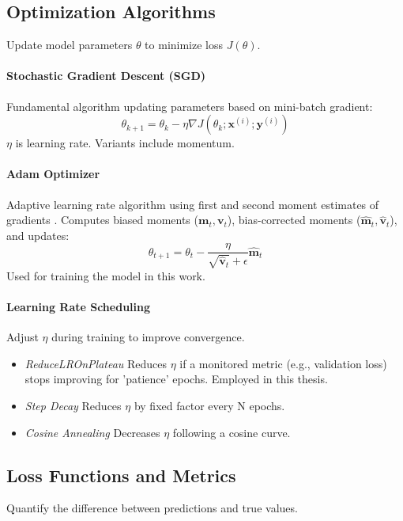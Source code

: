 \begin{appendices}
  \subsection{Optimization Algorithms}
  \label{subsec:optimization_app}
  Update model parameters $ \theta $ to minimize loss $ J(\theta) $.

  \paragraph{Stochastic Gradient Descent (SGD)}
  Fundamental algorithm updating parameters based on mini-batch gradient:
  \begin{equation}
    \theta_{k+1} = \theta_k - \eta \nabla J(\theta_k; \bm{x}^{(i)}; \bm{y}^{(i)})
  \end{equation}
  $ \eta $ is learning rate. Variants include momentum.

  \paragraph{Adam Optimizer}
  Adaptive learning rate algorithm using first and second moment estimates of gradients \autocite{kingma2014adam}. Computes biased moments ($ \bm{m}_t, \bm{v}_t $), bias-corrected moments ($ \hat{\bm{m}}_t, \hat{\bm{v}}_t $), and updates:
  \begin{equation}
    \theta_{t+1} = \theta_t - \frac{\eta}{\sqrt{\hat{\bm{v}}_t} + \epsilon} \hat{\bm{m}}_t
    \label{eq:adam}
  \end{equation}
  Used for training the model in this work.

  \paragraph{Learning Rate Scheduling}
  Adjust $ \eta $ during training to improve convergence.
  \begin{itemize}
    \item \textit{ReduceLROnPlateau} Reduces $ \eta $ if a monitored metric (e.g., validation loss) stops improving for 'patience' epochs. Employed in this thesis.
    \item \textit{Step Decay} Reduces $ \eta $ by fixed factor every N epochs.
    \item \textit{Cosine Annealing} Decreases $ \eta $ following a cosine curve.
  \end{itemize}

  \subsection{Loss Functions and Metrics}
  \label{subsec:loss_metrics_app}
  Quantify the difference between predictions and true values.


\end{appendices}
